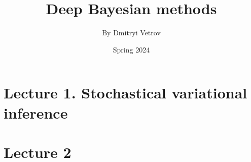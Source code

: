 \documentclass[a4paper]{article}
\title{Deep Bayesian methods}
\author{By Dmitryi Vetrov}
\date{Spring 2024}
\begin{document}
  

\maketitle

\tableofcontents

\newpage

\section{Lecture 1. Stochastical variational inference}



\section{Lecture 2}




\end{document}
